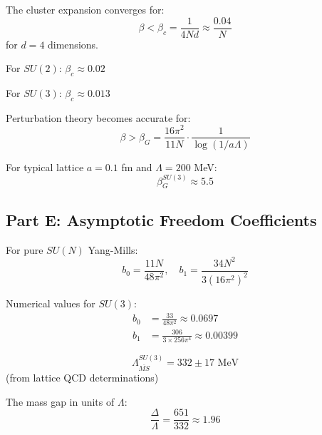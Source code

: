 \begin{inequality}
\label{ineq:strong-coupling}
The cluster expansion converges for:
\begin{equation}
\boxed{\beta < \beta_c = \frac{1}{4Nd} \approx \frac{0.04}{N}}
\end{equation}
for $d = 4$ dimensions.

For $SU(2)$: $\beta_c \approx 0.02$

For $SU(3)$: $\beta_c \approx 0.013$
\end{inequality}

\begin{inequality}
\label{ineq:weak-coupling}
Perturbation theory becomes accurate for:
\begin{equation}
\boxed{\beta > \beta_G = \frac{16\pi^2}{11N} \cdot \frac{1}{\log(1/a\Lambda)}}
\end{equation}

For typical lattice $a = 0.1$ fm and $\Lambda = 200$ MeV:
\begin{equation}
\beta_G^{SU(3)} \approx 5.5
\end{equation}
\end{inequality}

\subsection{Part E: Asymptotic Freedom Coefficients}

\begin{inequality}
\label{ineq:beta-function}
For pure $SU(N)$ Yang-Mills:
\begin{equation}
\boxed{b_0 = \frac{11N}{48\pi^2}, \quad b_1 = \frac{34N^2}{3(16\pi^2)^2}}
\end{equation}

Numerical values for $SU(3)$:
\begin{align}
b_0 &= \frac{33}{48\pi^2} \approx 0.0697 \\
b_1 &= \frac{306}{3 \times 256\pi^4} \approx 0.00399
\end{align}
\end{inequality}

\begin{inequality}
\label{ineq:lambda}
\begin{equation}
\boxed{\Lambda_{\overline{MS}}^{SU(3)} = 332 \pm 17 \text{ MeV}}
\end{equation}
(from lattice QCD determinations)

The mass gap in units of $\Lambda$:
\begin{equation}
\frac{\Delta}{\Lambda} = \frac{651}{332} \approx 1.96
\end{equation}
\end{inequality}

